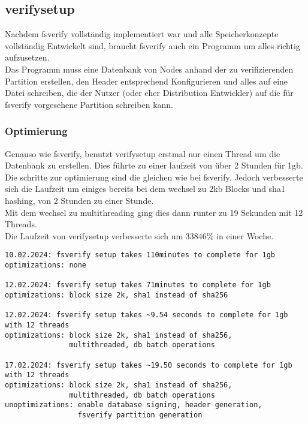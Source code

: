 \subsection{verifysetup}
Nachdem fsverify vollständig implementiert war und alle Speicherkonzepte vollständig Entwickelt sind, braucht fsverify auch ein Programm um alles richtig aufzusetzen.\\
Das Programm muss eine Datenbank von Nodes anhand der zu verifizierenden Partition erstellen, den Header entsprechend Konfigurieren und alles auf eine Datei schreiben, die der Nutzer (oder eher Distribution Entwickler) auf die für fsverify vorgesehene Partition schreiben kann.

\subsubsection{Optimierung}
Genauso wie fsverify, benutzt verifysetup erstmal nur einen Thread um die Datenbank zu erstellen. Dies führte zu einer laufzeit von über 2 Stunden für 1gb.\\
Die schritte zur optimierung sind die gleichen wie bei fsverify. Jedoch verbesserte sich die Laufzeit um einiges bereits bei dem wechsel zu 2kb Blocks und sha1 hashing, von 2 Stunden zu einer Stunde.\\
Mit dem wechsel zu multithreading ging dies dann runter zu 19 Sekunden mit 12 Threads.
\\
Die Laufzeit von verifysetup verbesserte sich um 33846\% in einer Woche.
\begin{verbatim}
10.02.2024: fsverify setup takes 110minutes to complete for 1gb
optimizations: none

12.02.2024: fsverify setup takes 71minutes to complete for 1gb
optimizations: block size 2k, sha1 instead of sha256

12.02.2024: fsverify setup takes ~9.54 seconds to complete for 1gb with 12 threads
optimizations: block size 2k, sha1 instead of sha256,
               multithreaded, db batch operations

17.02.2024: fsverify setup takes ~19.50 seconds to complete for 1gb with 12 threads
optimizations: block size 2k, sha1 instead of sha256,
               multithreaded, db batch operations
unoptimizations: enable database signing, header generation,
                 fsverify partition generation
\end{verbatim}

